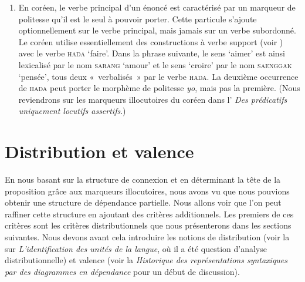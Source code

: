 {\begin{enumerate}
    \ea
      \ea
        {Peter}\textbf{{’s}}  {sleeping} =  {Peter} \textbf{{is}}  {sleeping}  ‘Pierre est en train de dormir’, lit. Pierre est dormant.
      \ex
        {Peter}\textbf{{’s}}  {eaten}   =   {Peter} \textbf{{has}}  {eaten}   ‘Pierre a (déjà) mangé’
        \z
    \z
    \item En coréen, le verbe principal d’un énoncé est caractérisé par un marqueur de politesse qu’il est le seul à pouvoir porter. Cette particule s’ajoute optionnellement sur le verbe principal, mais jamais sur un verbe subordonné. Le coréen utilise essentiellement des constructions à verbe support (voir ) avec le verbe \textsc{hada} ‘faire’. Dans la phrase suivante, le sens ‘aimer’ est ainsi lexicalisé par le nom \textsc{sarang} ‘amour’ et le sens ‘croire’ par le nom \textsc{saenggak} ‘pensée’, tous deux «~verbalisés~» par le verbe \textsc{hada}. La deuxième occurrence de \textsc{hada} peut porter le morphème de politesse \textit{yo}, mais pas la première. (Nous reviendrons sur les marqueurs illocutoires du coréen dans l’ \textit{Des prédicatifs uniquement locutifs assertifs}.)

    \ea
    \z
    \z
    \end{enumerate}
}
\section{Distribution et valence}\label{sec:3.3.10}

En nous basant sur la structure de connexion et en déterminant la tête de la proposition grâce aux marqueurs illocutoires, nous avons vu que nous pouvions obtenir une structure de dépendance partielle. Nous allons voir que l’on peut raffiner cette structure en ajoutant des critères additionnels. Les premiers de ces critères sont les critères distributionnels que nous présenterons dans les sections suivantes. Nous devons avant cela introduire les notions de distribution (voir la  sur \textit{L’identification des unités de la langue}, où il a été question d’analyse distributionnelle) et valence (voir la  \textit{Historique des représentations syntaxiques par des diagrammes en dépendance} pour un début de discussion).

